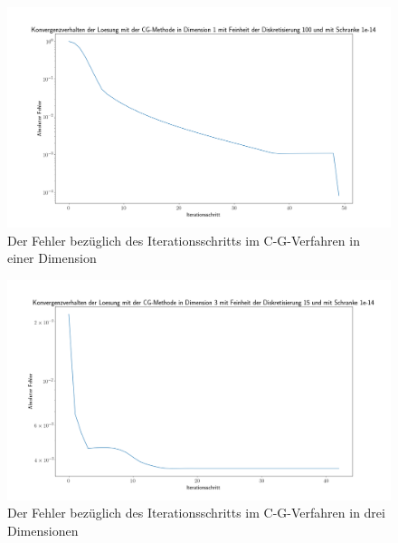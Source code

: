 \documentclass[smallheadings]{scrartcl}
\numberwithin{equation}{section}
\begin{document}
\begin{figure}[H]
	\centering
	\includegraphics[width=\linewidth]{Bilder/IterDim1}
	\caption{Der Fehler bezüglich des Iterationsschritts im C-G-Verfahren in einer Dimension}
	\label{fig:iterdim1}
\end{figure}

\begin{figure}[H]
	\centering
	\includegraphics[width=\linewidth]{Bilder/IterDim3}
	\caption{Der Fehler bezüglich des Iterationsschritts im C-G-Verfahren in drei Dimensionen}
	\label{fig:iterdim3}
\end{figure}
 
\end{document}
